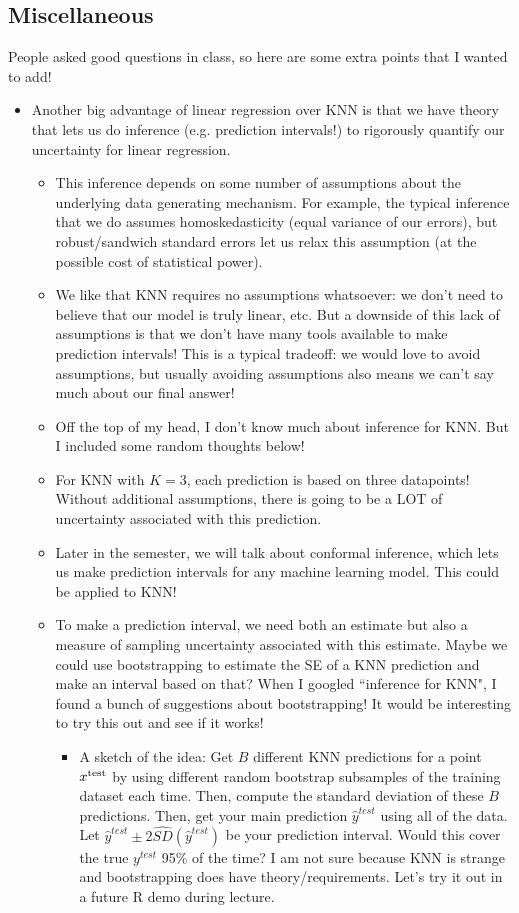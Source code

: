 \subsection{Miscellaneous}

People asked good questions in class, so here are some extra points that I wanted to add! 

\begin{itemize}
\item Another big advantage of linear regression over KNN is that we have theory that lets us do inference (e.g. prediction intervals!) to rigorously quantify our uncertainty for linear regression. 
\begin{itemize}
\item This inference depends on some number of assumptions about the underlying data generating mechanism. For example, the typical inference that we do assumes homoskedasticity (equal variance of our errors), but robust/sandwich standard errors let us relax this assumption (at the possible cost of statistical power). 
\item We like that KNN requires no assumptions whatsoever: we don't need to believe that our model is truly linear, etc. But a downside of this lack of assumptions is that we don't have many tools available to make prediction intervals! This is a typical tradeoff: we would love to avoid assumptions, but usually avoiding assumptions also means we can't say much about our final answer!
\item Off the top of my head, I don't know much about inference for KNN. But I included some random thoughts below! 
\item For KNN with $K=3$, each prediction is based on three datapoints! Without additional assumptions, there is going to be a LOT of uncertainty associated with this prediction. 
\item Later in the semester, we will talk about conformal inference, which lets us make prediction intervals for any machine learning model. This could be applied to KNN!
\item To make a prediction interval, we need both an estimate but also a measure  of sampling uncertainty associated with this estimate. Maybe we could use bootstrapping to estimate the SE of a KNN prediction and make an interval based on that? When I googled ``inference for KNN", I found a bunch of suggestions about bootstrapping! It would be interesting to try this out and see if it works! 
\begin{itemize}
\item A sketch of the idea: Get $B$ different KNN predictions for a point $x^{\mathrm{test}}$ by using different random bootstrap subsamples of the training dataset each time. Then, compute the standard deviation of these $B$ predictions. Then, get your main prediction $\hat{y}^{test}$ using all of the data. Let $\hat{y}^{test} \pm 2 \hat{SD}(\hat{y}^{test})$ be your prediction interval. Would this cover the true $y^{test}$ 95\% of the time? I am not sure because KNN is strange and bootstrapping does have theory/requirements. Let's try it out in a future R demo during lecture. 

\end{itemize}
\end{itemize}
\end{itemize}
